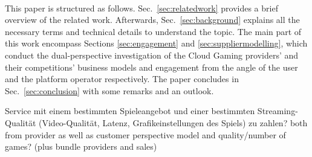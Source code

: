 ~\\
This paper is structured as follows. Sec.~\ref{sec:relatedwork} 
provides a brief overview of the related work. Afterwards, 
Sec.~\ref{sec:background} explains all the necessary terms and 
technical details to understand the topic. The main part of this work 
encompass Sections \ref{sec:engagement} and 
\ref{sec:suppliermodelling}, which conduct the dual-perspective 
investigation of the Cloud Gaming providers' and their competitions' 
business models and engagement from the angle of the user and the 
platform operator respectively. The paper concludes in 
Sec.~\ref{sec:conclusion} with some remarks and an outlook.


Service mit einem bestimmten Spieleangebot und einer bestimmten 
Streaming- Qualität (Video-Qualität, Latenz, Grafikeinstellungen des 
Spiels) zu zahlen?
both from provider as well as customer perspective
model and quality/number of games? (plus bundle providers and sales)
